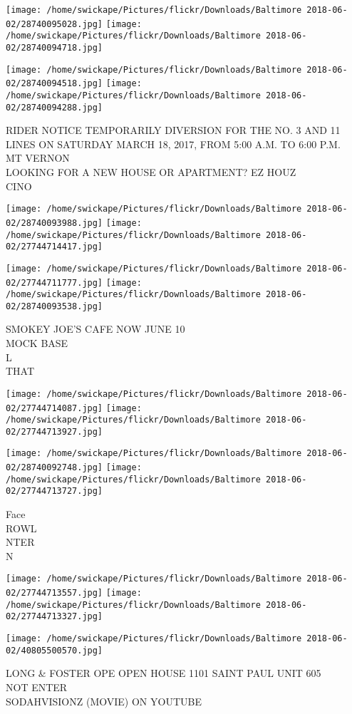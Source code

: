 \documentclass[10pt,letterpaper]{article}
\begin{document}
\texttt{[image: /home/swickape/Pictures/flickr/Downloads/Baltimore 2018-06-02/28740095028.jpg]}
\texttt{[image: /home/swickape/Pictures/flickr/Downloads/Baltimore 2018-06-02/28740094718.jpg]}

\texttt{[image: /home/swickape/Pictures/flickr/Downloads/Baltimore 2018-06-02/28740094518.jpg]}
\texttt{[image: /home/swickape/Pictures/flickr/Downloads/Baltimore 2018-06-02/28740094288.jpg]}

RIDER NOTICE TEMPORARILY DIVERSION FOR THE NO. 3 AND 11 LINES ON SATURDAY MARCH 18, 2017, FROM 5:00 A.M. TO 6:00 P.M.\\
MT VERNON\\
LOOKING FOR A NEW HOUSE OR APARTMENT?  EZ HOUZ\\
CINO\\
\pagebreak

\texttt{[image: /home/swickape/Pictures/flickr/Downloads/Baltimore 2018-06-02/28740093988.jpg]}
\texttt{[image: /home/swickape/Pictures/flickr/Downloads/Baltimore 2018-06-02/27744714417.jpg]}

\texttt{[image: /home/swickape/Pictures/flickr/Downloads/Baltimore 2018-06-02/27744711777.jpg]}
\texttt{[image: /home/swickape/Pictures/flickr/Downloads/Baltimore 2018-06-02/28740093538.jpg]}

SMOKEY JOE'S CAFE NOW JUNE 10\\
MOCK BASE\\
L\\
THAT\\
\pagebreak

\texttt{[image: /home/swickape/Pictures/flickr/Downloads/Baltimore 2018-06-02/27744714087.jpg]}
\texttt{[image: /home/swickape/Pictures/flickr/Downloads/Baltimore 2018-06-02/27744713927.jpg]}

\texttt{[image: /home/swickape/Pictures/flickr/Downloads/Baltimore 2018-06-02/28740092748.jpg]}
\texttt{[image: /home/swickape/Pictures/flickr/Downloads/Baltimore 2018-06-02/27744713727.jpg]}

Face\\
ROWL\\
NTER\\
N\\
\pagebreak

\texttt{[image: /home/swickape/Pictures/flickr/Downloads/Baltimore 2018-06-02/27744713557.jpg]}
\texttt{[image: /home/swickape/Pictures/flickr/Downloads/Baltimore 2018-06-02/27744713327.jpg]}

\texttt{[image: /home/swickape/Pictures/flickr/Downloads/Baltimore 2018-06-02/40805500570.jpg]}

LONG \& FOSTER OPE OPEN HOUSE 1101 SAINT PAUL UNIT 605\\
NOT ENTER\\
SODAHVISIONZ (MOVIE) ON YOUTUBE\\
\pagebreak
\end{document}
